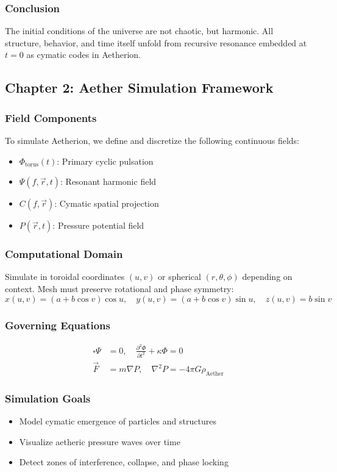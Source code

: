 \subsubsection*{Conclusion}
The initial conditions of the universe are not chaotic, but harmonic. All structure, behavior, and time itself unfold from recursive resonance embedded at \( t = 0 \) as cymatic codes in Aetherion.

\subsection{Chapter 2: Aether Simulation Framework}
\subsubsection*{Field Components}
To simulate Aetherion, we define and discretize the following continuous fields:
\begin{itemize}
    \item \( \Phi_{\text{torus}}(t) \): Primary cyclic pulsation
    \item \( \Psi(f, \vec{r}, t) \): Resonant harmonic field
    \item \( C(f, \vec{r}) \): Cymatic spatial projection
    \item \( P(\vec{r}, t) \): Pressure potential field
\end{itemize}

\subsubsection*{Computational Domain}
Simulate in toroidal coordinates \( (u, v) \) or spherical \( (r, \theta, \phi) \) depending on context. Mesh must preserve rotational and phase symmetry:
\[
x(u, v) = (a + b \cos v) \cos u, \quad y(u, v) = (a + b \cos v) \sin u, \quad z(u, v) = b \sin v
\]

\subsubsection*{Governing Equations}
\[
\begin{aligned}
\square \Psi &= 0, \quad \frac{\partial^2 \Phi}{\partial t^2} + \kappa \Phi = 0 \\
\vec{F} &= m \nabla P, \quad \nabla^2 P = -4 \pi G \rho_{\text{Aether}}
\end{aligned}
\]

\subsubsection*{Simulation Goals}
\begin{itemize}
    \item Model cymatic emergence of particles and structures
    \item Visualize aetheric pressure waves over time
    \item Detect zones of interference, collapse, and phase locking
\end{itemize}

